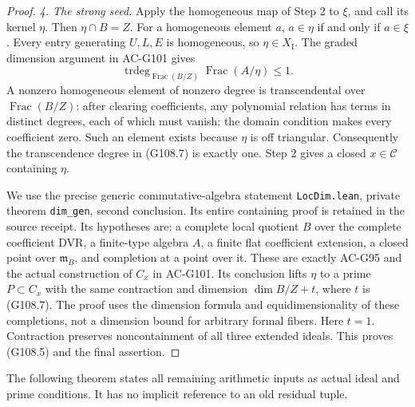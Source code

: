 \begin{proof}
\emph{4. The strong seed.}
Apply the homogeneous map of Step 2 to $\xi$, and call its kernel
$\eta$.  Then $\eta\cap B=Z$.  For a homogeneous element $a$,
$a\in\eta$ if and only if $a\in\xi$.  Every entry generating
$U,L,E$ is homogeneous, so $\eta\in X_{\mathrm I}$.
The graded dimension argument in AC-G101 gives
\[
 \operatorname{trdeg}_{\operatorname{Frac}(B/Z)}
            \operatorname{Frac}(A/\eta)\leq1.
 \tag{G108.7}
\]
A nonzero homogeneous element of nonzero degree is transcendental
over $\operatorname{Frac}(B/Z)$: after clearing coefficients,
any polynomial relation has terms in distinct degrees, each of
which must vanish; the domain condition makes every coefficient
zero.  Such an element exists because $\eta$ is off triangular.
Consequently the transcendence degree in (G108.7) is exactly one.
Step 2 gives a closed $x\in\mathcal C$ containing $\eta$.

We use the precise generic commutative-algebra statement
\texttt{LocDim.lean}, private theorem \texttt{dim\_gen}, second
conclusion.  Its entire containing proof is retained in the source
receipt.  Its hypotheses are: a complete local quotient $B$ over
the complete coefficient DVR, a finite-type algebra $A$, a finite
flat coefficient extension, a closed point over $\mathfrak m_B$,
and completion at a point over it.  These are exactly AC-G95 and
the actual construction of $C_x$ in AC-G101.  Its conclusion
lifts $\eta$ to a prime $P\subset C_x$ with the same contraction
and dimension $\dim B/Z+t$, where $t$ is (G108.7).
The proof uses the dimension formula and equidimensionality of
these completions, not a dimension bound for arbitrary formal
fibers.  Here $t=1$.  Contraction preserves noncontainment of all
three extended ideals.  This proves (G108.5) and the final assertion.
\end{proof}

The following theorem states all remaining arithmetic inputs as
actual ideal and prime conditions.  It has no implicit reference
to an old residual tuple.

